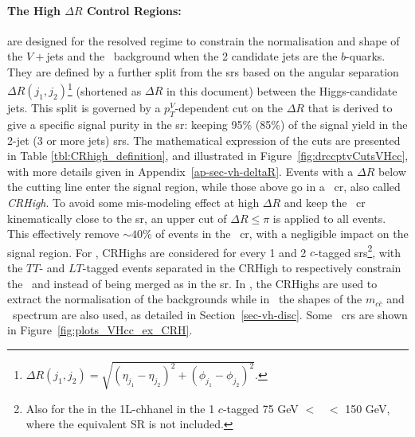 \paragraph{The High $\Delta R$ Control Regions:} are designed for the resolved regime to constrain the normalisation and shape of the $V+$jets and the \ttb\ background when the 2 candidate jets are the $b$-quarks. They are defined by a further split from the \gls{sr}s based on the angular separation $\Delta R(j_1, j_2)$\footnote{$\Delta R(j_1, j_2) = \sqrt{(\eta_{j_1} - \eta_{j_2})^2 + (\phi_{j_1} - \phi_{j_2})^2 }$.} (shortened as $\Delta R$ in this document) between the Higgs-candidate jets. This split is governed by a $p_T^V$-dependent cut on the $\Delta R$ that is derived to give a specific signal purity in the \gls{sr}: keeping 95\% (85\%) of the signal yield in the 2-jet (3 or more jets) \gls{sr}s. The mathematical expression of the cuts are presented in Table \ref{tbl:CRhigh_definition}, and illustrated in Figure~\ref{fig:drccptvCutsVHcc}, with more details given in Appendix~\ref{ap-sec-vh-deltaR}. Events with a $\Delta R$ below the cutting line enter the signal region, while those above go in a \highdr\ \gls{cr}, also called \textit{CRHigh}. To avoid some mis-modeling effect at high $\Delta R$ and keep the \highdr\ \gls{cr} kinematically close to the \gls{sr}, an upper cut of $\Delta R \leq \pi$ is applied to all events. This effectively remove $\sim 40$\% of events in the \highdr\ \gls{cr}, with a negligible impact on the signal region. For \vhc, CRHighs are considered for every 1 and 2 $c$-tagged \gls{sr}s\footnote{Also for the in the 1L-chhanel in the 1 $c$-tagged 75 GeV $<$ \ptv\ $<$ 150 GeV, where the equivalent SR is not included.}, with the $TT$- and $LT$-tagged events separated in the CRHigh to respectively constrain the \vhf\ and \vmf instead of being merged as in the \gls{sr}. In \vhb, the CRHighs are used to extract the normalisation of the backgrounds while in \vhc\ the shapes of the $m_{c\bar{c}}$ and \ptv\ spectrum are also used, as detailed in Section~\ref{sec-vh-disc}. Some \highdr\ \gls{cr}s are shown in Figure~\ref{fig:plots_VHcc_ex_CRH}.

